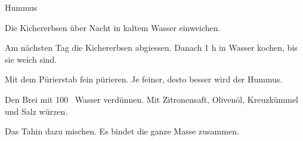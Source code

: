 
\begin{recipe}[]{Hummus}{}{}



\step%
Die Kichererbsen \"uber Nacht in kaltem Wasser einweichen.

\step%
Am n\"achsten Tag die Kichererbsen abgiessen. Danach 1 h in Wasser kochen, bis
sie weich sind.


\step%
Mit dem P\"urierstab fein p\"urieren. Je feiner, desto besser wird der Hummus.

\step%
Den Brei mit 100 \ml~Wasser verd\"unnen. Mit Zitronensaft, Oliven\"ol,
Kreuzk\"ummel und Salz w\"urzen.

\step%
Das Tahin dazu mischen. Es bindet die ganze Masse zusammen.


\end{recipe}
